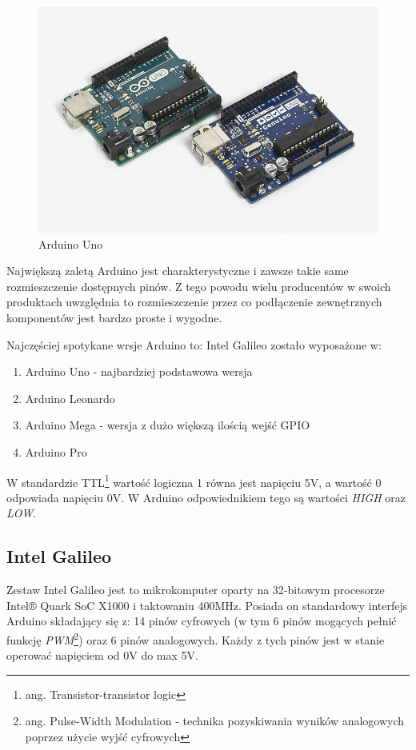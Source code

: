 \documentclass{xmgr}
\begin{document}
\begin{figure}[!h]
    \centering
    \includegraphics[height=0.4\textwidth]{images/uno.jpg}
    \caption{Arduino Uno \label{Arduino Uno}}
\end{figure}

Największą zaletą Arduino jest charakterystyczne i zawsze takie same rozmieszczenie dostępnych pinów. Z tego powodu wielu producentów w swoich produktach uwzględnia to rozmieszczenie przez co podłączenie zewnętrznych komponentów jest bardzo proste i wygodne.

Najczęściej spotykane wrsje Arduino to:
Intel Galileo zostało wyposażone w:
\begin{enumerate}
  \item Arduino Uno - najbardziej podstawowa wersja
  \item Arduino Leonardo
  \item Arduino Mega - wersja z dużo większą ilością wejść GPIO
  \item Arduino Pro
\end{enumerate}

W standardzie TTL\footnote{ang. Transistor-transistor logic} wartość logiczna 1 równa jest napięciu 5V, a wartość 0 odpowiada napięciu 0V. W Arduino odpowiednikiem tego są wartości \emph{HIGH} oraz \emph{LOW}.
 
\subsection{Intel Galileo}
Zestaw Intel Galileo jest  to mikrokomputer oparty na 32-bitowym procesorze Intel® Quark SoC X1000 i taktowaniu 400MHz. Posiada on standardowy interfejs Arduino składający się z: 14 pinów cyfrowych (w tym 6 pinów mogących pełnić funkcję \emph{PWM}\footnote{ang. Pulse-Width Modulation - technika pozyskiwania wyników analogowych poprzez użycie wyjść cyfrowych}) oraz 6 pinów analogowych. Każdy z tych pinów jest w stanie operować napięciem od 0V do max 5V.
\end{document}
